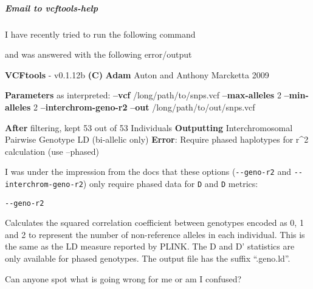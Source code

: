 \documentclass[letterpaper]{scrartcl}
\newenvironment{Shaded}{}{}
\newcommand{\KeywordTok}[1]{\textcolor[rgb]{0.00,0.44,0.13}{\textbf{{#1}}}}
\newcommand{\OtherTok}[1]{\textcolor[rgb]{0.00,0.44,0.13}{{#1}}}
\newcommand{\NormalTok}[1]{{#1}}
\renewenvironment{quote}{\begin{blockquote}\list{}{\rightmargin=0em\leftmargin=0em}%
\item\relax\color{greytext}\ignorespaces}{\unskip\unskip\endlist\end{blockquote}}
\begin{document}
\subparagraph{Email to vcftools-help}\label{email-to-vcftools-help}

I have recently tried to run the following command

\begin{Shaded}
\end{Shaded}

and was answered with the following error/output

\begin{Shaded}
\begin{Highlighting}[]
\KeywordTok{VCFtools} \NormalTok{- v0.1.12b}
\KeywordTok{(C)} \KeywordTok{Adam} \NormalTok{Auton and Anthony Marcketta 2009}

\KeywordTok{Parameters} \NormalTok{as interpreted:}
        \KeywordTok{--vcf} \NormalTok{/long/path/to/snps.vcf}
        \KeywordTok{--max-alleles} \NormalTok{2}
        \KeywordTok{--min-alleles} \NormalTok{2}
        \KeywordTok{--interchrom-geno-r2}
        \KeywordTok{--out} \NormalTok{/long/path/to/out/snps.vcf}

\KeywordTok{After} \NormalTok{filtering, kept 53 out of 53 Individuals}
\KeywordTok{Outputting} \NormalTok{Interchromosomal Pairwise Genotype LD (bi-allelic only)}
\KeywordTok{Error}\NormalTok{: Require phased haplotypes for r^2 calculation (use --phased)}
\end{Highlighting}
\end{Shaded}

I was under the impression from the docs that these options
(\texttt{-\/-geno-r2} and \texttt{-\/-interchrom-geno-r2}) only require
phased data for \texttt{D} and \texttt{D\textquotesingle{}} metrics:

\begin{quote}
\texttt{-\/-geno-r2}

Calculates the squared correlation coefficient between genotypes encoded
as 0, 1 and 2 to represent the number of non-reference alleles in each
individual. This is the same as the LD measure reported by PLINK. The D
and D' statistics are only available for phased genotypes. The output
file has the suffix ``.geno.ld''.
\end{quote}

Can anyone spot what is going wrong for me or am I confused?
\end{document}

